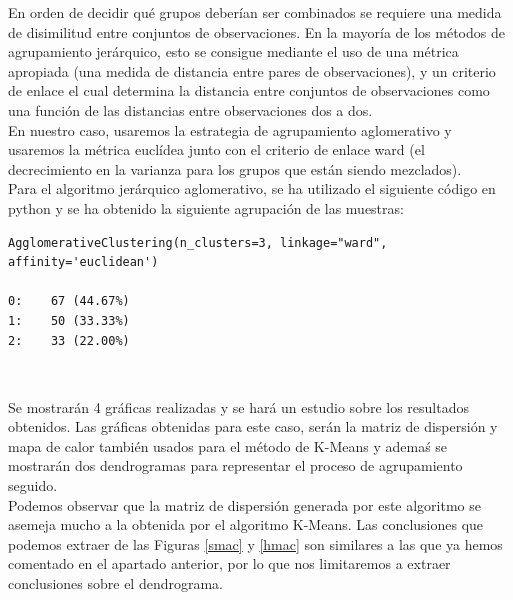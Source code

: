 \documentclass[a4paper, 20pt]{article}
\begin{document}
En orden de decidir qué grupos deberían ser combinados se requiere una medida de disimilitud entre conjuntos de observaciones. En la mayoría de los métodos de agrupamiento jerárquico, esto se consigue mediante el uso de una métrica apropiada (una medida de distancia entre pares de observaciones), y un criterio de enlace el cual determina la distancia entre conjuntos de observaciones como una función de las distancias entre observaciones dos a dos.\\

En nuestro caso, usaremos la estrategia de agrupamiento aglomerativo y usaremos la métrica euclídea junto con el criterio de enlace ward (el decrecimiento en la varianza para los grupos que están siendo mezclados).\\

Para el algoritmo jerárquico aglomerativo, se ha utilizado el siguiente código en python y se ha obtenido la siguiente agrupación de las muestras:\\

\begin{lstlisting}
AgglomerativeClustering(n_clusters=3, linkage="ward", affinity='euclidean')

0:    67 (44.67%)
1:    50 (33.33%)
2:    33 (22.00%)
\end{lstlisting}\

Se mostrarán 4 gráficas realizadas y se hará un estudio sobre los resultados obtenidos. Las gráficas obtenidas para este caso, serán la matriz de dispersión y mapa de calor también usados para el método de K-Means y ademaś se mostrarán dos dendrogramas para representar el proceso de agrupamiento seguido.\\

Podemos observar que la matriz de dispersión generada por este algoritmo se asemeja mucho a la obtenida por el algoritmo K-Means. Las conclusiones que podemos extraer de las Figuras \ref{smac} y \ref{hmac} son similares a las que ya hemos comentado en el apartado anterior, por lo que nos limitaremos a extraer conclusiones sobre el dendrograma.

\clearpage
\end{document}

